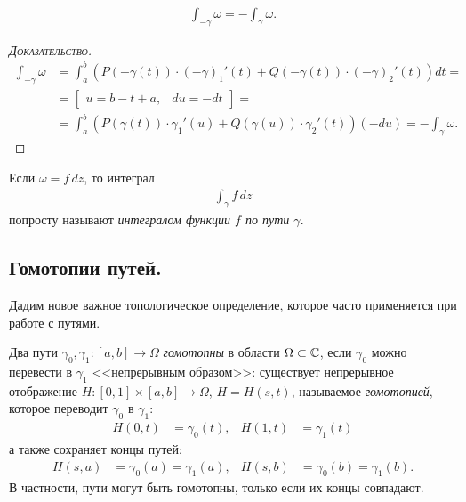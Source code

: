 \documentclass[../complex-analysis.tex]{subfiles}
\begin{document}
\begin{prop}
 \begin{align*}
  \int_{-\gamma} \omega = -\int_{\gamma} \omega.  
 \end{align*}
\end{prop}
\begin{proof}[\normalfont\textsc{Доказательство}]
 \begin{align*}
  \int_{-\gamma} \omega &= \int_{a}^{b} \left( P(-\gamma(t)) \cdot (-\gamma)_1'(t)  + Q(-\gamma(t)) \cdot (-\gamma)_2'(t) \right) dt = \\
  &= \begin{bmatrix}
   u = b - t + a, & du = -dt
  \end{bmatrix} = \\
  &= \int_{a}^{b} \left( P(\gamma(t)) \cdot \gamma_1'(u) + Q(\gamma(u)) \cdot \gamma_2'(t) \right)(-du) = - \int_{\gamma} \omega. 
 \end{align*}
\end{proof}

\begin{conventn}
 Если $ \omega = f\,dz $, то интеграл
 \begin{align*}
  \int_{\gamma} f\,dz 
 \end{align*} попросту называют \emph{интегралом функции $ f $ по пути $ \gamma $}.
\end{conventn}

\subsection{Гомотопии путей.}

Дадим новое важное топологическое определение, которое часто применяется при работе с путями.

\begin{df}
 \label{definition:path-homotopy}
 Два пути $ \gamma_0,\gamma_1\colon [a,b] \to \Omega$ \textit{гомотопны} в области $ \Omega \subset \mathbb{C} $, если $ \gamma_0 $ можно перевести в $ \gamma_1 $ <<непрерывным образом>>: существует непрерывное отображение $ H \colon [0,1] \times [a,b] \to \Omega $, $ H = H(s,t) $, называемое \textit{гомотопией}, которое переводит $ \gamma_0 $ в $ \gamma_1 $:
 \begin{align*}
  H(0, t) &= \gamma_0(t), & H(1,t)&=\gamma_1(t)
 \end{align*} а также сохраняет концы путей:
 \begin{align*}
  H(s, a) &= \gamma_0(a) = \gamma_1(a), & H(s,b) &= \gamma_0(b) = \gamma_1(b).
 \end{align*} В частности, пути могут быть гомотопны, только если их концы совпадают.
\end{df}
\end{document}
